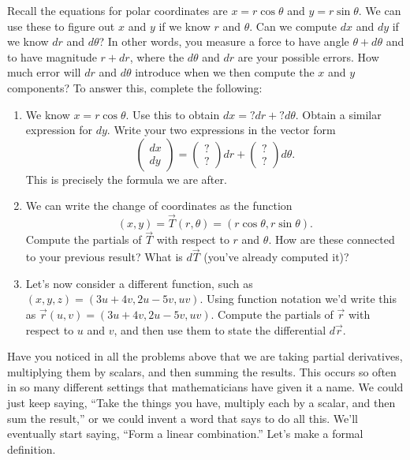 \begin{problem}\label{linear combination first differential}
 Recall the equations for polar coordinates are $x=r\cos\theta$ and $y=r\sin\theta$. We can use these to figure out $x$ and $y$ if we know $r$ and $\theta$.  Can we compute $dx$ and $dy$ if we know $dr$ and $d\theta$? In other words, you measure a force to have angle $\theta +d\theta$ and to have magnitude $r+dr$, where the $d\theta$ and $dr$ are your possible errors. How much error will $dr$ and $d\theta$ introduce when we then compute the $x$ and $y$ components?  To answer this, complete the following:
\begin{enumerate}
 \item We know $x = r\cos\theta$.  Use this to obtain $dx = ?dr+?d\theta$.  Obtain a similar expression for $dy$. Write your two expressions in the vector form 
$$
\begin{pmatrix}
 dx\\dy
\end{pmatrix}
=
\begin{pmatrix}
 ?\\?
\end{pmatrix}
dr+
\begin{pmatrix}
 ?\\?
\end{pmatrix}
d\theta
.$$ This is precisely the formula we are after. 
 \item We can write the change of coordinates as the function $$(x,y)=\vec T(r,\theta) = (r\cos\theta,r\sin\theta).$$  Compute the partials of $\vec T$ with respect to $r$ and $\theta$.  How are these connected to your previous result? What is $d\vec T$ (you've already computed it)? 
 \item Let's now consider a different function, such as $(x,y,z) = (3u+4v, 2u-5v, uv)$. Using function notation we'd write this as
$\vec r(u,v) = (3u+4v, 2u-5v, uv)$. Compute the partials of $\vec r$ with respect to $u$ and $v$, and then use them to state the differential $d\vec r$. 
\end{enumerate}

\end{problem}





Have you noticed in all the problems above that we are taking partial derivatives, multiplying them by scalars, and then summing the results.  This occurs so often in so many different settings that mathematicians have given it a name. We could just keep saying, ``Take the things you have, multiply each by a scalar, and then sum the result,'' or we could invent a word that says to do all this. We'll eventually start saying, ``Form a linear combination.'' 
Let's make a formal definition.





